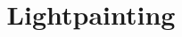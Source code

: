 \documentclass[12pt]{article}
\title{Lightpainting}
\date{}
\begin{document}
  \maketitle
\begin{small}

\end{small}
\end{document}
